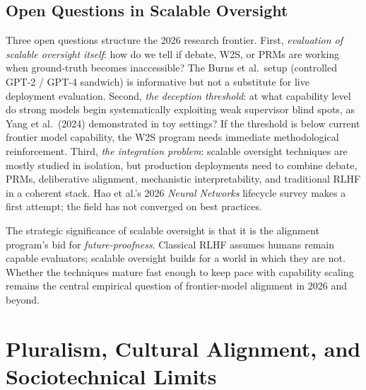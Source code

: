 \subsection{Open Questions in Scalable Oversight}\label{open-questions-in-scalable-oversight}

Three open questions structure the 2026 research frontier. First, \emph{evaluation of scalable oversight itself}: how do we tell if debate, W2S, or PRMs are working when ground-truth becomes inaccessible? The Burns et al.~setup (controlled GPT-2 / GPT-4 sandwich) is informative but not a substitute for live deployment evaluation. Second, \emph{the deception threshold}: at what capability level do strong models begin systematically exploiting weak supervisor blind spots, as Yang et al.~(2024) demonstrated in toy settings? If the threshold is below current frontier model capability, the W2S program needs immediate methodological reinforcement. Third, \emph{the integration problem}: scalable oversight techniques are mostly studied in isolation, but production deployments need to combine debate, PRMs, deliberative alignment, mechanistic interpretability, and traditional RLHF in a coherent stack. Hao et al.'s 2026 \emph{Neural Networks} lifecycle survey makes a first attempt; the field has not converged on best practices.

The strategic significance of scalable oversight is that it is the alignment program's bid for \emph{future-proofness}. Classical RLHF assumes humans remain capable evaluators; scalable oversight builds for a world in which they are not. Whether the techniques mature fast enough to keep pace with capability scaling remains the central empirical question of frontier-model alignment in 2026 and beyond.

\section{Pluralism, Cultural Alignment, and Sociotechnical Limits}\label{pluralism-cultural-alignment-and-sociotechnical-limits}


